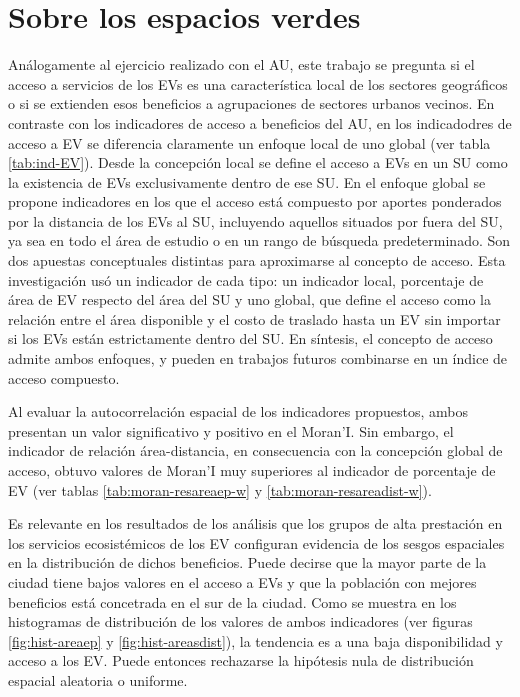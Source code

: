 \documentclass[12pt,a4paper,openany]{book}
\theoremstyle{definition}
\theoremstyle{definition}
\theoremstyle{definition}
\theoremstyle{remark}
\begin{document}
\section{Sobre los espacios verdes}\label{sobre-los-espacios-verdes}

Análogamente al ejercicio realizado con el AU, este trabajo se pregunta
si el acceso a servicios de los EVs es una característica local de los
sectores geográficos o si se extienden esos beneficios a agrupaciones de
sectores urbanos vecinos. En contraste con los indicadores de acceso a
beneficios del AU, en los indicadodres de acceso a EV se diferencia
claramente un enfoque local de uno global (ver tabla \ref{tab:ind-EV}).
Desde la concepción local se define el acceso a EVs en un SU como la
existencia de EVs exclusivamente dentro de ese SU. En el enfoque global
se propone indicadores en los que el acceso está compuesto por aportes
ponderados por la distancia de los EVs al SU, incluyendo aquellos
situados por fuera del SU, ya sea en todo el área de estudio o en un
rango de búsqueda predeterminado. Son dos apuestas conceptuales
distintas para aproximarse al concepto de acceso. Esta investigación usó
un indicador de cada tipo: un indicador local, porcentaje de área de EV
respecto del área del SU y uno global, que define el acceso como la
relación entre el área disponible y el costo de traslado hasta un EV sin
importar si los EVs están estrictamente dentro del SU. En síntesis, el
concepto de acceso admite ambos enfoques, y pueden en trabajos futuros
combinarse en un índice de acceso compuesto.

Al evaluar la autocorrelación espacial de los indicadores propuestos,
ambos presentan un valor significativo y positivo en el Moran'I. Sin
embargo, el indicador de relación área-distancia, en consecuencia con la
concepción global de acceso, obtuvo valores de Moran'I muy superiores al
indicador de porcentaje de EV (ver tablas \ref{tab:moran-resareaep-w} y
\ref{tab:moran-resareadist-w}).

Es relevante en los resultados de los análisis que los grupos de alta
prestación en los servicios ecosistémicos de los EV configuran evidencia
de los sesgos espaciales en la distribución de dichos beneficios. Puede
decirse que la mayor parte de la ciudad tiene bajos valores en el acceso
a EVs y que la población con mejores beneficios está concetrada en el
sur de la ciudad. Como se muestra en los histogramas de distribución de
los valores de ambos indicadores (ver figuras \ref{fig:hist-areaep} y
\ref{fig:hist-areasdist}), la tendencia es a una baja disponibilidad y
acceso a los EV. Puede entonces rechazarse la hipótesis nula de
distribución espacial aleatoria o uniforme.
\end{document}
